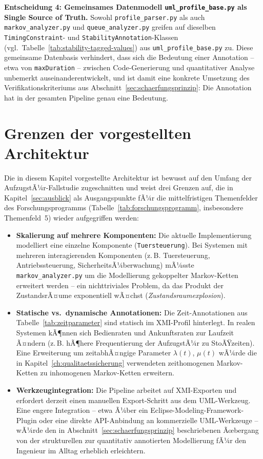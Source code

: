 ﻿\documentclass[a4paper,12pt]{report}
\theoremstyle{definition}
\begin{document}
\textbf{Entscheidung 4: Gemeinsames Datenmodell \texttt{uml\_profile\_base.py}
als Single Source of Truth.} Sowohl \texttt{profile\_parser.py} als auch
\texttt{markov\_analyzer.py} und \texttt{queue\_analyzer.py} greifen auf
dieselben \texttt{TimingConstraint}- und \texttt{StabilityAnnotation}-Klassen
(vgl.\ Tabelle~\ref{tab:stability-tagged-values}) aus
\texttt{uml\_profile\_base.py} zu. Diese gemeinsame Datenbasis verhindert,
dass sich die Bedeutung einer Annotation -- etwa von \texttt{maxDuration} --
zwischen Code-Generierung und quantitativer Analyse unbemerkt
auseinanderentwickelt, und ist damit eine konkrete Umsetzung des
Verifikationskriteriums aus Abschnitt~\ref{sec:schaerfungsprinzip}: Die
Annotation hat in der gesamten Pipeline genau eine Bedeutung.

\section{Grenzen der vorgestellten Architektur}
\label{sec:architektur-grenzen}

Die in diesem Kapitel vorgestellte Architektur ist bewusst auf den Umfang
der AufzugstÃ¼r-Fallstudie zugeschnitten und weist drei Grenzen auf, die in
Kapitel~\ref{sec:ausblick} als Ausgangspunkte fÃ¼r die mittelfristigen
Themenfelder des Forschungsprogramms (Tabelle~\ref{tab:forschungsprogramm},
insbesondere Themenfeld~5) wieder aufgegriffen werden:

\begin{itemize}
  \item \textbf{Skalierung auf mehrere Komponenten:} Die aktuelle
  Implementierung modelliert eine einzelne Komponente
  (\texttt{Tuersteuerung}). Bei Systemen mit mehreren interagierenden
  Komponenten (z.\,B. Tuersteuerung, Antriebssteuerung,
  SicherheitsÃ¼berwachung) mÃ¼sste \texttt{markov\_analyzer.py} um die
  Modellierung gekoppelter Markov-Ketten erweitert werden -- ein
  nichttriviales Problem, da das Produkt der ZustandsrÃ¤ume exponentiell
  wÃ¤chst (\emph{Zustandsraumexplosion}).

  \item \textbf{Statische vs.\ dynamische Annotationen:} Die
  Zeit-Annotationen aus Tabelle~\ref{tab:zeitparameter} sind statisch im
  XMI-Profil hinterlegt. In realen Systemen kÃ¶nnen sich Bedienraten und
  Ankunftsraten zur Laufzeit Ã¤ndern (z.\,B. hÃ¶here Frequentierung der
  AufzugstÃ¼r zu StoÃŸzeiten). Eine Erweiterung um zeitabhÃ¤ngige Parameter
  $\lambda(t)$, $\mu(t)$ wÃ¼rde die in Kapitel~\ref{ch:qualitaetssicherung}
  verwendeten zeithomogenen Markov-Ketten zu inhomogenen Markov-Ketten
  erweitern.

  \item \textbf{Werkzeugintegration:} Die Pipeline arbeitet auf
  XMI-Exporten und erfordert derzeit einen manuellen Export-Schritt aus dem
  UML-Werkzeug. Eine engere Integration -- etwa Ã¼ber ein
  Eclipse-Modeling-Framework-Plugin oder eine direkte API-Anbindung an
  kommerzielle UML-Werkzeuge -- wÃ¼rde den in
  Abschnitt~\ref{sec:schaerfungsprinzip} beschriebenen Ãœbergang von der
  strukturellen zur quantitativ annotierten Modellierung fÃ¼r den Ingenieur
  im Alltag erheblich erleichtern.
\end{itemize}
\end{document}
